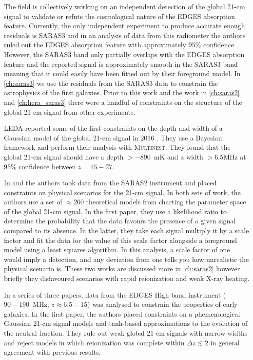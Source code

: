The field is collectively working on an independent detection of the global 21-cm signal to validate or refute the cosmological nature of the EDGES absorption feature. Currently, the only independent experiment to produce accurate enough residuals is SARAS3 and in an analysis of data from this radiometer the authors ruled out the EDGES absorption feature with approximately 95\% confidence \cite{SARAS3}. However, the SARAS3 band only partially overlaps with the EDGES absorption feature and the reported signal is approximately smooth in the SARAS3 band meaning that it could easily have been fitted out by their foreground model. In \cref{ch:saras3} we use the residuals from the SARAS3 data to constrain the astrophysics of the first galaxies. Prior to this work and the work in \cref{ch:saras2} and \cref{ch:hera_saras3} there were a handful of constraints on the structure of the global 21-cm signal from other experiments.

LEDA reported some of the first constraints on the depth and width of a Gaussian model of the global 21-cm signal in 2016 \cite{Bernardi_LEDA_2016}. They use a Bayesian framework and perform their analysis with \textsc{Multinest}. They found that the global 21-cm signal should have a depth $> -890$~mK and a width $> 6.5$MHz at 95\% confidence between $z=15-27$.

In \cite{Singh_saras2_2017} and \cite{Singh_saras2_2018} the authors took data from the SARAS2 instrument and placed constraints on physical scenarios for the 21-cm signal. In both sets of work, the authors use a set of $\approx260$ theoretical models from \cite{Cohen_global_2017} charting the parameter space of the global 21-cm signal. In the first paper, they use a likelihood ratio to determine the probability that the data favours the presence of a given signal compared to its absence. In the latter, they take each signal multiply it by a scale factor and fit the data for the value of this scale factor alongside a foreground model using a least squares algorithm. In this analysis, a scale factor of one would imply a detection, and any deviation from one tells you how unrealistic the physical scenario is. These two works are discussed more in \cref{ch:saras2} however briefly they disfavoured scenarios with rapid reionization and weak X-ray heating.

In a series of three papers, data from the EDGES High band instrument ($90 - 190$~MHz, $z \approx6.5 - 15$) was analysed to constrain the properties of early galaxies. In the first paper, the authors placed constraints on a phemenological Gaussian 21-cm signal models and tanh-based approximations to the evolution of the neutral fraction. They rule out weak global 21-cm signals with narrow widths and reject models in which reionization was complete within $\Delta z \lesssim 2$ \cite{Monsalve_EDGES_HB_1_2017} in general agreement with previous results.

